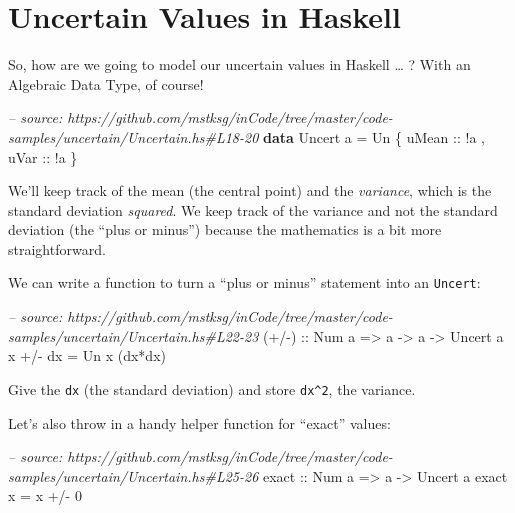 \documentclass[]{article}
\newenvironment{Shaded}{}{}
\newcommand{\KeywordTok}[1]{\textcolor[rgb]{0.00,0.44,0.13}{\textbf{#1}}}
\newcommand{\DataTypeTok}[1]{\textcolor[rgb]{0.56,0.13,0.00}{#1}}
\newcommand{\DecValTok}[1]{\textcolor[rgb]{0.25,0.63,0.44}{#1}}
\newcommand{\CommentTok}[1]{\textcolor[rgb]{0.38,0.63,0.69}{\textit{#1}}}
\newcommand{\OtherTok}[1]{\textcolor[rgb]{0.00,0.44,0.13}{#1}}
\newcommand{\FunctionTok}[1]{\textcolor[rgb]{0.02,0.16,0.49}{#1}}
\newcommand{\NormalTok}[1]{#1}
\begin{document}
\section{Uncertain Values in Haskell}\label{uncertain-values-in-haskell}

So, how are we going to model our uncertain values in Haskell \ldots{} ? With an
Algebraic Data Type, of course!

\begin{Shaded}
\begin{Highlighting}[]
\CommentTok{-- source: https://github.com/mstksg/inCode/tree/master/code-samples/uncertain/Uncertain.hs#L18-20}
\KeywordTok{data} \DataTypeTok{Uncert}\NormalTok{ a }\FunctionTok{=} \DataTypeTok{Un}\NormalTok{ \{}\OtherTok{ uMean ::} \FunctionTok{!}\NormalTok{a}
\NormalTok{                   ,}\OtherTok{ uVar  ::} \FunctionTok{!}\NormalTok{a}
\NormalTok{                   \}}
\end{Highlighting}
\end{Shaded}

We'll keep track of the mean (the central point) and the \emph{variance}, which
is the standard deviation \emph{squared}. We keep track of the variance and not
the standard deviation (the ``plus or minus'') because the mathematics is a bit
more straightforward.

We can write a function to turn a ``plus or minus'' statement into an
\texttt{Uncert}:

\begin{Shaded}
\begin{Highlighting}[]
\CommentTok{-- source: https://github.com/mstksg/inCode/tree/master/code-samples/uncertain/Uncertain.hs#L22-23}
\OtherTok{(+/-) ::} \DataTypeTok{Num}\NormalTok{ a }\OtherTok{=>}\NormalTok{ a }\OtherTok{->}\NormalTok{ a }\OtherTok{->} \DataTypeTok{Uncert}\NormalTok{ a}
\NormalTok{x }\FunctionTok{+/-}\NormalTok{ dx }\FunctionTok{=} \DataTypeTok{Un}\NormalTok{ x (dx}\FunctionTok{*}\NormalTok{dx)}
\end{Highlighting}
\end{Shaded}

Give the \texttt{dx} (the standard deviation) and store \texttt{dx\^{}2}, the
variance.

Let's also throw in a handy helper function for ``exact'' values:

\begin{Shaded}
\begin{Highlighting}[]
\CommentTok{-- source: https://github.com/mstksg/inCode/tree/master/code-samples/uncertain/Uncertain.hs#L25-26}
\OtherTok{exact ::} \DataTypeTok{Num}\NormalTok{ a }\OtherTok{=>}\NormalTok{ a }\OtherTok{->} \DataTypeTok{Uncert}\NormalTok{ a}
\NormalTok{exact x }\FunctionTok{=}\NormalTok{ x }\FunctionTok{+/-} \DecValTok{0}
\end{Highlighting}
\end{Shaded}
\end{document}
